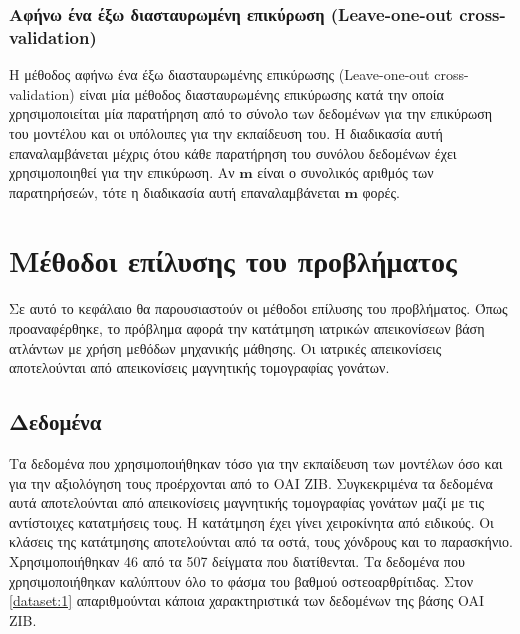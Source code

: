 \documentclass[a4paper,12pt]{article}
\begin{document}
\subsubsection{Αφήνω ένα έξω διασταυρωμένη επικύρωση (Leave-one-out
cross-validation)} \label{leave_one_out:1}

Η μέθοδος αφήνω ένα έξω διασταυρωμένης επικύρωσης (Leave-one-out
cross-validation) είναι μία μέθοδος διασταυρωμένης επικύρωσης κατά την οποία
χρησιμοποιείται μία παρατήρηση από το σύνολο των δεδομένων για την επικύρωση του
μοντέλου και οι υπόλοιπες για την εκπαίδευση του. Η διαδικασία αυτή
επαναλαμβάνεται μέχρις ότου κάθε παρατήρηση του συνόλου δεδομένων έχει
χρησιμοποιηθεί για την επικύρωση. Αν $\bm{m}$ είναι ο συνολικός αριθμός των
παρατηρήσεών, τότε η διαδικασία αυτή επαναλαμβάνεται $\bm{m}$ φορές.

\section{Μέθοδοι επίλυσης του προβλήματος}

Σε αυτό το κεφάλαιο θα παρουσιαστούν οι μέθοδοι επίλυσης του προβλήματος. Όπως
προαναφέρθηκε, το πρόβλημα αφορά την κατάτμηση ιατρικών απεικονίσεων βάση
ατλάντων με χρήση μεθόδων μηχανικής μάθησης. Οι ιατρικές απεικονίσεις
αποτελούνται από απεικονίσεις μαγνητικής τομογραφίας γονάτων.

\subsection{Δεδομένα} \label{data:1}

Τα δεδομένα που χρησιμοποιήθηκαν τόσο για την εκπαίδευση των μοντέλων όσο και
για την αξιολόγηση τους προέρχονται από το OAI ZIB. Συγκεκριμένα τα δεδομένα
αυτά αποτελούνται από απεικονίσεις μαγνητικής τομογραφίας γονάτων μαζί με τις
αντίστοιχες κατατμήσεις τους. Η κατάτμηση έχει γίνει χειροκίνητα από ειδικούς.
Οι κλάσεις της κατάτμησης αποτελούνται από τα οστά, τους χόνδρους και το
παρασκήνιο. Χρησιμοποιήθηκαν 46 από τα 507 δείγματα που διατίθενται. Τα δεδομένα
που χρησιμοποιήθηκαν καλύπτουν όλο το φάσμα του βαθμού οστεοαρθρίτιδας. Στον
\autoref{dataset:1} απαριθμούνται κάποια χαρακτηριστικά των δεδομένων της βάσης
OAI ZIB.
\end{document}
